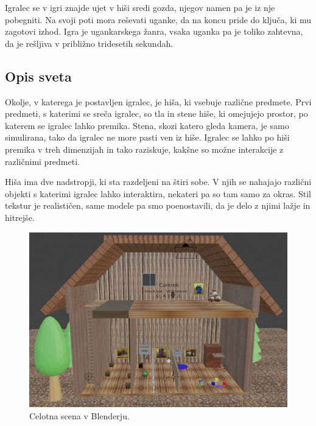 \documentclass[a4paper,12pt]{article}
\begin{document}
Igralec se v igri znajde ujet v hiši sredi gozda, njegov namen pa je iz nje pobegniti. Na svoji poti mora reševati uganke, da na koncu pride do ključa, ki mu zagotovi izhod. Igra je ugankarskega žanra, vsaka uganka pa je toliko zahtevna, da je rešljiva v približno tridesetih sekundah.

\subsection{Opis sveta}
Okolje, v katerega je postavljen igralec, je hiša, ki vsebuje različne predmete. Prvi predmeti, s katerimi se sreča igralec, so tla in stene hiše, ki omejujejo prostor, po katerem se igralec lahko premika. Stena, skozi katero gleda kamera, je samo simulirana, tako da igralec ne more pasti ven iz hiše. Igralec se lahko po hiši premika v treh dimenzijah in tako raziskuje, kakšne so možne interakcije z različnimi predmeti.

Hiša ima dve nadstropji, ki sta razdeljeni na štiri sobe. V njih se nahajajo različni objekti s katerimi igralec lahko interaktira, nekateri pa so tam samo za okras. Stil tekstur je realističen, same modele pa smo poenostavili, da je delo z njimi lažje in hitrejše.

\begin{figure}[!htb]
    \begin{center}
        \includegraphics[width=\columnwidth]{svet.jpg}
        \caption{Celotna scena v Blenderju.}
    \end{center}
\end{figure}
\end{document}
